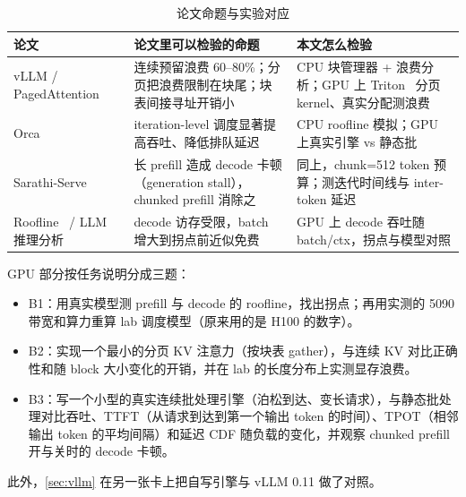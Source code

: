 \documentclass[11pt,a4paper]{ctexart}
\begin{document}
\begin{table}[H]\centering\small
\caption{论文命题与实验对应}
\begin{tabularx}{\linewidth}{>{\raggedright\arraybackslash}p{3.0cm}>{\raggedright\arraybackslash}X>{\raggedright\arraybackslash}X}
\toprule
论文 & 论文里可以检验的命题 & 本文怎么检验 \\
\midrule
vLLM / PagedAttention~\cite{kwon2023} & 连续预留浪费 60--80\%；分页把浪费限制在块尾；块表间接寻址开销小 & CPU 块管理器 + 浪费分析；GPU 上 Triton~\cite{tillet2019} 分页 kernel、真实分配测浪费 \\
Orca~\cite{yu2022} & iteration-level 调度显著提高吞吐、降低排队延迟 & CPU roofline 模拟；GPU 上真实引擎 vs 静态批 \\
Sarathi-Serve~\cite{agrawal2024} & 长 prefill 造成 decode 卡顿（generation stall），chunked prefill 消除之 & 同上，chunk=512 token 预算；测迭代时间线与 inter-token 延迟 \\
Roofline~\cite{williams2009} / LLM 推理分析~\cite{pope2023} & decode 访存受限，batch 增大到拐点前近似免费 & GPU 上 decode 吞吐随 batch/ctx，拐点与模型对照 \\
\bottomrule
\end{tabularx}
\end{table}

GPU 部分按任务说明分成三题：
\begin{itemize}
\item B1：用真实模型测 prefill 与 decode 的 roofline，找出拐点；再用实测的 5090 带宽和算力重算 lab 调度模型（原来用的是 H100 的数字）。
\item B2：实现一个最小的分页 KV 注意力（按块表 gather），与连续 KV 对比正确性和随 block 大小变化的开销，并在 lab 的长度分布上实测显存浪费。
\item B3：写一个小型的真实连续批处理引擎（泊松到达、变长请求），与静态批处理对比吞吐、TTFT（从请求到达到第一个输出 token 的时间）、TPOT（相邻输出 token 的平均间隔）和延迟 CDF 随负载的变化，并观察 chunked prefill 开与关时的 decode 卡顿。
\end{itemize}
此外，\cref{sec:vllm} 在另一张卡上把自写引擎与 vLLM 0.11 做了对照。
\end{document}
